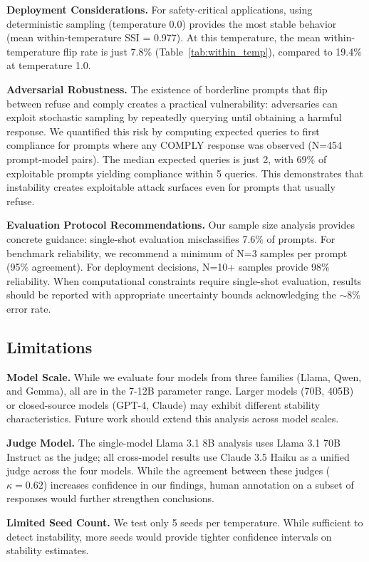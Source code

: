 \documentclass[11pt]{article}
\begin{document}
\textbf{Deployment Considerations.} For safety-critical applications, using deterministic sampling (temperature 0.0) provides the most stable behavior (mean within-temperature SSI = 0.977). At this temperature, the mean within-temperature flip rate is just 7.8\% (Table~\ref{tab:within_temp}), compared to 19.4\% at temperature 1.0.

\textbf{Adversarial Robustness.} The existence of borderline prompts that flip between refuse and comply creates a practical vulnerability: adversaries can exploit stochastic sampling by repeatedly querying until obtaining a harmful response. We quantified this risk by computing expected queries to first compliance for prompts where any COMPLY response was observed (N=454 prompt-model pairs). The median expected queries is just 2, with 69\% of exploitable prompts yielding compliance within 5 queries. This demonstrates that instability creates exploitable attack surfaces even for prompts that usually refuse.

\textbf{Evaluation Protocol Recommendations.} Our sample size analysis provides concrete guidance: single-shot evaluation misclassifies 7.6\% of prompts. For benchmark reliability, we recommend a minimum of N=3 samples per prompt (95\% agreement). For deployment decisions, N=10+ samples provide 98\% reliability. When computational constraints require single-shot evaluation, results should be reported with appropriate uncertainty bounds acknowledging the $\sim$8\% error rate.

\subsection{Limitations}

\textbf{Model Scale.} While we evaluate four models from three families (Llama, Qwen, and Gemma), all are in the 7-12B parameter range. Larger models (70B, 405B) or closed-source models (GPT-4, Claude) may exhibit different stability characteristics. Future work should extend this analysis across model scales.

\textbf{Judge Model.} The single-model Llama 3.1 8B analysis uses Llama 3.1 70B Instruct as the judge; all cross-model results use Claude 3.5 Haiku as a unified judge across the four models. While the agreement between these judges ($\kappa=0.62$) increases confidence in our findings, human annotation on a subset of responses would further strengthen conclusions.

\textbf{Limited Seed Count.} We test only 5 seeds per temperature. While sufficient to detect instability, more seeds would provide tighter confidence intervals on stability estimates.
\end{document}
